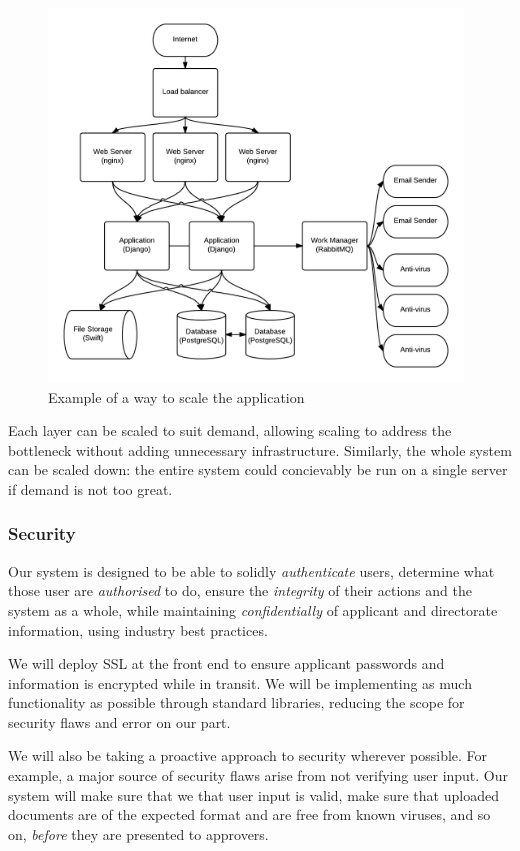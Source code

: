 \documentclass[12pt]{article}
\begin{document}
\begin{figure}[htbp]
\centering
\includegraphics[width=0.98\textwidth]{./imgs/tech-scaling.png}
\caption{Example of a way to scale the application}
\end{figure}

Each layer can be scaled to suit demand, allowing scaling to address the
bottleneck without adding unnecessary infrastructure. Similarly, the
whole system can be scaled down: the entire system could concievably be
run on a single server if demand is not too great.

\subsubsection{Security}

Our system is designed to be able to solidly \emph{authenticate} users,
determine what those user are \emph{authorised} to do, ensure the
\emph{integrity} of their actions and the system as a whole, while
maintaining \emph{confidentially} of applicant and directorate
information, using industry best practices.

We will deploy SSL at the front end to ensure applicant passwords and
information is encrypted while in transit. We will be implementing as
much functionality as possible through standard libraries, reducing the
scope for security flaws and error on our part.

We will also be taking a proactive approach to security wherever
possible. For example, a major source of security flaws arise from not
verifying user input. Our system will make sure that we that user input
is valid, make sure that uploaded documents are of the expected format
and are free from known viruses, and so on, \emph{before} they are
presented to approvers.
\end{document}
